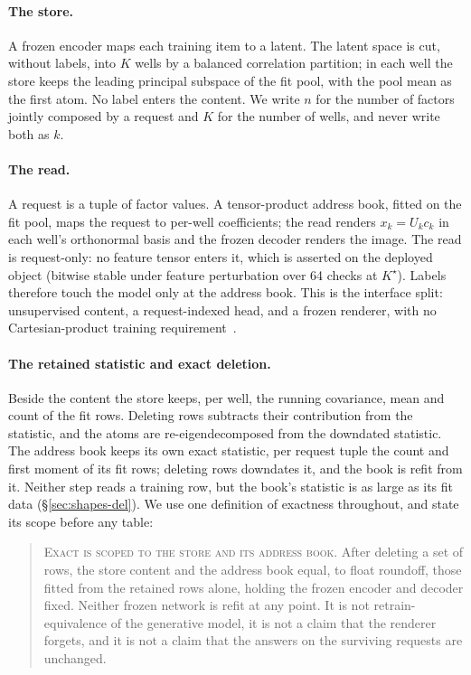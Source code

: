 \documentclass{article} %
\newcommand{\Kstar}{\ensuremath{K^{\star}}}
\begin{document}


\paragraph{The store.} A frozen encoder maps each training item to a latent. The latent
space is cut, without labels, into $K$ wells by a balanced correlation partition; in each well
the store keeps the leading principal subspace of the fit pool, with the pool mean as the
first atom. No label enters the content. We write $n$ for the number of factors jointly
composed by a request and $K$ for the number of wells, and never write both as $k$.

\paragraph{The read.} A request is a tuple of factor values. A tensor-product address book,
fitted on the fit pool, maps the request to per-well coefficients; the read renders
$x_k=U_k c_k$ in each well's orthonormal basis and the frozen decoder renders the image. The
read is request-only: no feature tensor enters it, which is asserted on the deployed object
(bitwise stable under feature perturbation over 64 checks at $\Kstar$).
Labels therefore touch the model only at the address book. This is the interface split:
unsupervised content, a request-indexed head, and a frozen renderer, with no Cartesian-product
training requirement~\citep{wiedemer2023compositional,lachapelle2023additive,montero2022lost}.

\paragraph{The retained statistic and exact deletion.} Beside the content the store keeps, per
well, the running covariance, mean and count of the fit rows. Deleting rows subtracts their
contribution from the statistic, and the atoms are re-eigendecomposed from the downdated
statistic. The address book keeps its own exact statistic, per request tuple the count and first
moment of its fit rows; deleting rows downdates it, and the book is refit from it. Neither step
reads a training row, but the book's statistic is as large as its fit data
(\S\ref{sec:shapes-del}). We use one definition of exactness throughout, and state its scope
before any table:

\begin{quote}\small
\textsc{Exact is scoped to the store and its address book.} After deleting a set of rows, the store
content and the address book equal, to float roundoff, those fitted from the retained rows alone,
holding the frozen encoder and decoder fixed. Neither frozen network is refit at any point. It is
not retrain-equivalence of the generative model, it is not a claim that the renderer forgets, and it
is not a claim that the answers on the surviving requests are unchanged.
\end{quote}
\end{document}
